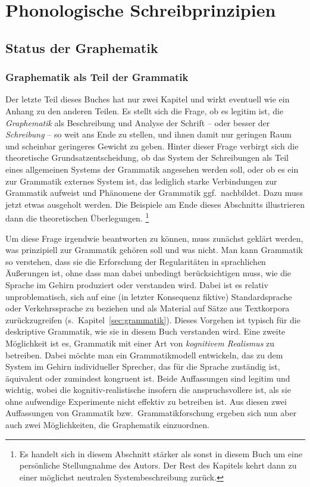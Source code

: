 \chapter{Phonologische Schreibprinzipien}

\label{sec:phonschrift}

\section{Status der Graphematik}

\subsection{Graphematik als Teil der Grammatik}

\label{sec:graphegrammatik}

Der letzte Teil dieses Buches hat nur zwei Kapitel und wirkt eventuell wie ein Anhang zu den anderen Teilen.
Es stellt sich die Frage, ob es legitim ist, die \textit{Graphematik} als Beschreibung und Analyse der Schrift -- oder besser der \textit{Schreibung} -- so weit ans Ende zu stellen, und ihnen damit nur geringen Raum und scheinbar geringeres Gewicht zu geben.
Hinter dieser Frage verbirgt sich die theoretische Grundsatzentscheidung, ob das System der Schreibungen als Teil eines allgemeinen Systems der Grammatik angesehen werden soll, oder ob es ein zur Grammatik externes System ist, das lediglich starke Verbindungen zur Grammatik aufweist und Phänomene der Grammatik ggf.\ nachbildet.
Dazu muss jetzt etwas ausgeholt werden.
Die Beispiele am Ende dieses Abschnitts illustrieren dann die theoretischen Überlegungen.%
\footnote{Es handelt sich in diesem Abschnitt stärker als sonst in diesem Buch um eine persönliche Stellungnahme des Autors.
Der Rest des Kapitels kehrt dann zu einer möglichst neutralen Systembeschreibung zurück.}

Um diese Frage irgendwie beantworten zu können, muss zunächst geklärt werden, was prinzipiell zur Grammatik gehören soll und was nicht.
Man kann Grammatik so verstehen, dass sie die Erforschung der Regularitäten in sprachlichen Äußerungen ist, ohne dass man dabei unbedingt berücksichtigen muss, wie die Sprache im Gehirn produziert oder verstanden wird.
Dabei ist es relativ unproblematisch, sich auf eine (in letzter Konsequenz fiktive) Standardsprache oder Verkehrssprache zu beziehen und als Material auf Sätze aus Textkorpora zurückzugreifen (s.\ Kapitel~\ref{sec:grammatik}).
Dieses Vorgehen ist typisch für die deskriptive Grammatik, wie sie in diesem Buch verstanden wird.
Eine zweite Möglichkeit ist es, Grammatik mit einer Art von \textit{kognitivem Realismus} zu betreiben.
Dabei möchte man ein Grammatikmodell entwickeln, das zu dem System im Gehirn individueller Sprecher, das für die Sprache zuständig ist, äquivalent oder zumindest kongruent ist.
Beide Auffassungen sind legitim und wichtig, wobei die kognitiv-realistische insofern die anspruchsvollere ist, als sie ohne aufwendige Experimente nicht effektiv zu betreiben ist.
Aus diesen zwei Auffassungen von Grammatik bzw.\ Grammatikforschung ergeben sich nun aber auch zwei Möglichkeiten, die Graphematik einzuordnen.

